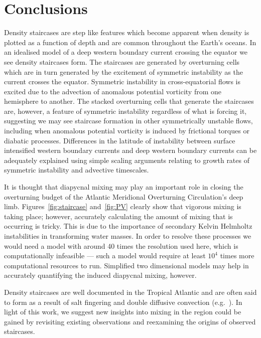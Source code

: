 \section{Conclusions}
\label{sec:conc}
Density staircases are step like features which become apparent when density is plotted as a function of depth and are common throughout the Earth's oceans. In an idealised model of a deep western boundary current crossing the equator we see density staircases form. The staircases are generated by overturning cells which are in turn generated by the excitement of symmetric instability as the current crosses the equator. Symmetric instability in cross-equatorial flows is excited due to the advection of anomalous potential vorticity from one hemisphere to another. The stacked overturning cells that generate the staircases are, however, a feature of symmetric instability regardless of what is forcing it, suggesting we may see staircase formation in other symmetrically unstable flows, including when anomalous potential vorticity is induced by frictional torques or diabatic processes. Differences in the latitude of instability between surface intensified western boundary currents and deep western boundary currents can be adequately explained using simple scaling arguments relating to growth rates of symmetric instability and advective timescales.

It is thought that diapycnal mixing may play an important role in closing the overturning budget of the Atlantic Meridional Overturning Circulation's deep limb. Figures~\ref{fig:staircase} and~\ref{fig:PV} clearly show that vigorous mixing is taking place; however, accurately calculating the amount of mixing that is occurring is tricky. This is due to the importance of secondary Kelvin Helmholtz instabilities in transforming water masses. In order to resolve these processes we would need a model with around 40 times the resolution used here, which is computationally infeasible --- such a model would require at least $10^4$ times more computational resources to run. Simplified two dimensional models may help in accurately quantifying the induced diapycnal mixing, however.

Density staircases are well documented in the Tropical Atlantic and are often said to form as a result of salt fingering and double diffusive convection (e.g.~\citet{Schmitt1987, Schmitt2005}). In light of this work, we suggest new insights into mixing in the region could be gained by revisiting existing observations and reexamining the origins of observed staircases.
